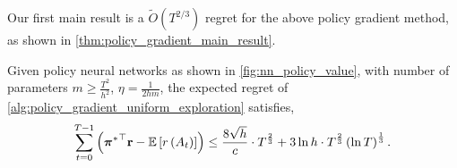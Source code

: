 Our first main result is a $\tilde{O}(T^{2/3})$ regret for the above policy gradient method, as shown in \cref{thm:policy_gradient_main_result}.

\begin{thm}
\label{thm:policy_gradient_main_result}
    Given policy neural networks as shown in \cref{fig:nn_policy_value}, with number of parameters $m \ge \frac{T^2}{h^2}$, $\eta = \frac{1}{2 h m}$, the expected regret of \cref{alg:policy_gradient_uniform_exploration} satisfies,
\begin{equation*}
\begin{split}
    \sum\limits_{t=0}^{T-1}{ \left( {{\boldsymbol{\pi}}^*}^\top {\mathbf{r}} - {\mathbb{E}} \left[ r\left(A_t\right) \right] \right)} \le \frac{8 \sqrt{h}}{c} \cdot T^{\frac{2}{3}} + 3 \ln{h} \cdot T^{\frac{2}{3}} \left(\ln{T}\right)^{\frac{1}{3}}.
\end{split}
\end{equation*}
\end{thm}
